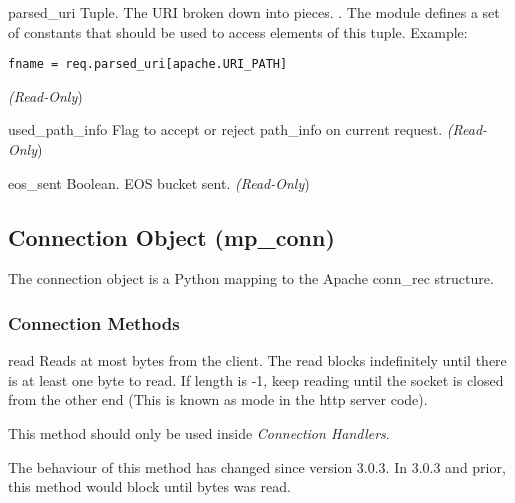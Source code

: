 \begin{memberdesc}[request]{parsed_uri}
  Tuple. The URI broken down into pieces.
  . 
  The  module defines a set of  constants that
  should be used to access elements of this tuple. Example:
  \begin{verbatim}
fname = req.parsed_uri[apache.URI_PATH]
  \end{verbatim}
  \emph{(Read-Only})
\end{memberdesc}

\begin{memberdesc}[request]{used_path_info}
  Flag to accept or reject path_info on current request.
  \emph{(Read-Only})
\end{memberdesc}

\begin{memberdesc}[request]{eos_sent}
  Boolean. EOS bucket sent.
  \emph{(Read-Only})
\end{memberdesc}

\subsection{Connection Object (mp_conn)\label{pyapi-mpconn}}

The connection object is a Python mapping to the Apache conn_rec
structure.

\subsubsection{Connection Methods\label{pyapi-mpconn-meth}}

\begin{methoddesc}[connection]{read}{}
  Reads at most  bytes from the client. The read blocks
  indefinitely until there is at least one byte to read. If length is
  -1, keep reading until the socket is closed from the other end (This
  is known as  mode in the http server code).

  This method should only be used inside \emph{Connection Handlers}.

  \begin{notice}
    The behaviour of this method has changed since version 3.0.3. In
    3.0.3 and prior, this method would block until  bytes
    was read.
  \end{notice}

\end{methoddesc}

